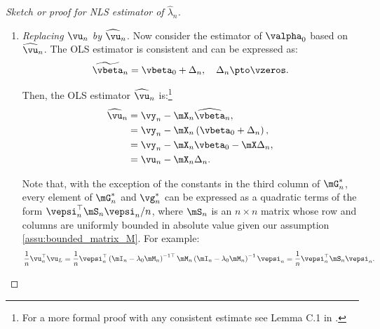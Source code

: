 \begin{proof}[Sketch or proof for NLS estimator of $\widehat{\lambda}_n$]
\begin{enumerate}
Also:
\begin{equation*}
\begin{aligned}
\plim \vg_n^* &= \plim \mG^*_n\valpha_0, \\
 & = \mGamma_n\valpha_0.
 \end{aligned}
\end{equation*}

If $\vu_n$ would be observed, a linear GMM estimator for $\lambda_0$, say $\widetilde{\lambda}$,  would be the first element of the least squared estimator $\widetilde{\valpha}_n$, namely:
\begin{equation*}
  \widetilde{\valpha}_n= \mG_n^{-1*}\vg_n^*, 
\end{equation*}
%
since $\mG_n^{*}$ is a $3\times 3$ matrix which is nonsingular. Thus, using our previous results:
\begin{equation}\label{eq:consisten_error_gm}
  \plim \widetilde{\valpha}_n=\plim \mG_n^{-1*} \plim \vg_n^* = \mGamma_n^{-1}\vgamma_n = \valpha_0.
\end{equation}

\item \emph{Replacing $\vu_n$ by $\widehat{\vu}_n$}. Now consider the estimator of $\valpha_0$ based on $\widehat{\vu}_n$. The OLS estimator is consistent and can be expressed as:
\begin{equation*}
\widetilde{\vbeta}_n = \vbeta_0 + \Delta_n, \quad \Delta_n\pto \vzeros.
\end{equation*}

Then, the OLS estimator $\widehat{\vu}_n$ is:\footnote{For a more formal proof with any consistent estimate see Lemma C.1 in \cite{kelejian2010specification}.}
\begin{equation*}
\begin{aligned}
\widehat{\vu}_n & = \vy_n - \mX_n\widehat{\vbeta}_n,  \\
              & = \vy_n - \mX_n\left(\vbeta_0 + \Delta_n\right), \\
              & = \vy_n - \mX_n\vbeta_0 - \mX\Delta_n, \\
              & = \vu_n - \mX_n\Delta_n. 
\end{aligned}
\end{equation*}

Note that, with the exception of the constants in the third column of $\mG^*_n$, every element of $\mG^*_n$ and $\vg_n^*$ can be expressed as a quadratic terms of the form $\vepsi^\top_n\mS_n\vepsi_n/n$, where $\mS_n$ is an $n\times n$ matrix whose row and columns are uniformly bounded in absolute value given our assumption \ref{assu:bounded_matrix_M}. For example:
\begin{equation*}
      \frac{1}{n}\vu^\top_n\vu_L  = \frac{1}{n} \vepsi^{\top}_n\left(\mI_n - \lambda_0\mM_n\right)^{-1\top}\mM_n\left(\mI_n - \lambda_0\mM_n\right)^{-1}\vepsi_n = \frac{1}{n}\vepsi^\top_n\mS_n\vepsi_n.
\end{equation*}


\end{enumerate}
\end{proof}
